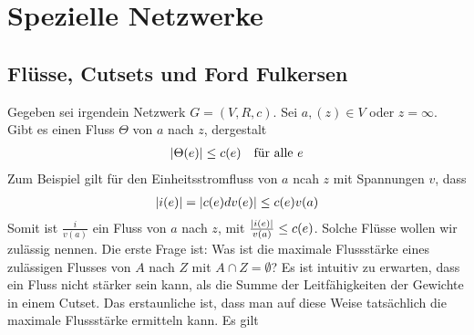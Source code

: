 \section{Spezielle Netzwerke}

\subsection{Flüsse, Cutsets und Ford Fulkersen}
Gegeben sei irgendein Netzwerk $G = (V,R,c).$ Sei $a,(z) \in V$ oder $z = \infty$. Gibt es einen Fluss $\Theta$ von $a$ nach $z$, dergestalt
\begin{align}
	\lvert\Theta(e)\rvert \leq c(e) && \text{für alle } e
\end{align}
Zum Beispiel gilt für den Einheitsstromfluss von $a$ ncah $z$ mit Spannungen $v$, dass 
\begin{align}
	\lvert i(e)\rvert = \lvert c(e) dv(e)\rvert \leq c(e)v(a)
\end{align}
Somit ist $\frac{i}{v(a)}$ ein Fluss von $a$ nach $z$, mit $\frac{\lvert i(e)\rvert}{v(a)} \leq c(e)$.  Solche Flüsse wollen wir zulässig nennen.
Die erste Frage ist: Was ist die maximale Flussstärke eines zulässigen Flusses von $A$ nach $Z$ mit $A \cap Z = \emptyset$?
Es ist intuitiv zu erwarten, dass ein Fluss nicht stärker sein kann, als die Summe der Leitfähigkeiten der Gewichte in einem Cutset.  Das erstaunliche ist, dass man auf diese Weise tatsächlich die maximale Flussstärke ermitteln kann. Es gilt

